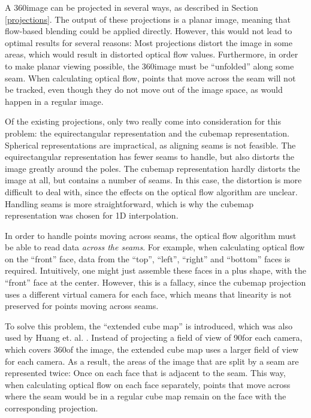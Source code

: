 A 360\degree image can be projected in several ways, as described in Section \ref{projections}. The output of these projections is a planar image, meaning that flow-based blending could be applied directly. However, this would not lead to optimal results for several reasons: Most projections distort the image in some areas, which would result in distorted optical flow values. Furthermore, in order to make planar viewing possible, the 360\degree image must be ``unfolded'' along some seam. When calculating optical flow, points that move across the seam will not be tracked, even though they do not move out of the image space, as would happen in a regular image.

Of the existing projections, only two really come into consideration for this problem: the equirectangular representation and the cubemap representation. Spherical representations are impractical, as aligning seams is not feasible. The equirectangular representation has fewer seams to handle, but also distorts the image greatly around the poles. The cubemap representation hardly distorts the image at all, but contains a number of seams. In this case, the distortion is more difficult to deal with, since the effects on the optical flow algorithm are unclear. Handling seams is more straightforward, which is why the cubemap representation was chosen for 1D interpolation.

In order to handle points moving across seams, the optical flow algorithm must be able to read data \emph{across the seams}. For example, when calculating optical flow on the ``front'' face, data from the ``top'', ``left'', ``right'' and ``bottom'' faces is required. Intuitively, one might just assemble these faces in a plus shape, with the ``front'' face at the center. However, this is a fallacy, since the cubemap projection uses a different virtual camera for each face, which means that linearity is not preserved for points moving across seams.


To solve this problem, the ``extended cube map'' is introduced, which was also used by Huang et. al. \cite{6dof}. Instead of projecting a field of view of 90\degree for each camera, which covers 360\degree of the image, the extended cube map uses a larger field of view for each camera. As a result, the areas of the image that are split by a seam are represented twice: Once on each face that is adjacent to the seam. This way, when calculating optical flow on each face separately, points that move across where the seam would be in a regular cube map remain on the face with the corresponding projection. 

